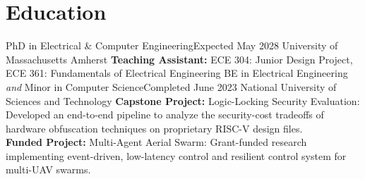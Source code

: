 \vspace{-7pt}
\section{Education}
  \resumeSubHeadingListStart
    \resumeSubheading
      {PhD in Electrical \& Computer Engineering}{Expected May 2028}
      {University of Massachusetts Amherst}{\vspace{7pt}}
      { \hspace*{1em}\small \textbf{Teaching Assistant:} ECE 304: Junior Design Project, ECE 361: Fundamentals of Electrical Engineering 
      }
      \vspace{-4pt}
    \resumeSubheading
      {BE in Electrical Engineering \textit{and} Minor in Computer Science}{Completed June 2023}
      {National University of Sciences and Technology}{\vspace{7pt}}
      { \hspace*{1em}\small \textbf{Capstone Project:} Logic-Locking Security Evaluation: Developed an end-to-end pipeline to analyze the security-cost \hspace*{1em} tradeoffs of hardware obfuscation techniques on proprietary RISC-V design files.
      }\\
      { \hspace*{1em}\small \textbf{Funded Project:} {Multi-Agent Aerial Swarm:} Grant-funded research implementing event-driven, low-latency control \hspace*{1em} and resilient control system for multi-UAV swarms. }
      \vspace{-7pt}
  \resumeSubHeadingListEnd

